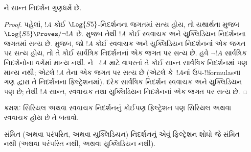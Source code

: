 \documentclass[../../../include/open-logic-section]{subfiles}
\begin{document}
\begin{cor}
  ને સાન્ત નિદર્શન ગુણધર્મ છે.
\end{cor}

\begin{proof}
  પહેલાં, $!A$ કોઈ $\Log{S5}$-નિદર્શનના જગતમાં સત્ય હોય,
  તો યથાર્થતા મુજબ $\Log{S5} \Proves/ \lnot !A$ છે.
   મુજબ તેથી $!A$ કોઈ
  સ્વવાચક અને યુક્લિડિયન નિદર્શનના જગતમાં સત્ય છે.
   મુજબ, જો $!A$ કોઈ સ્વવાચક
  અને યુક્લિડિયન નિદર્શનનાં એક જગત પર સત્ય હોય, તો તે કોઈ
  સાર્વત્રિક નિદર્શનનાં એક જગત પર સત્ય છે.
  હવે $\lnot !A$ સાર્વત્રિક નિદર્શનોના વર્ગમાં માન્ય નથી.
  ને $\lnot !A$ માટે વાપરતાં તે કોઈ
  સાન્ત સાર્વત્રિક નિદર્શનમાં પણ માન્ય નથી; એટલે $!A$ તેના એક
  જગત પર સત્ય છે (એટલે કે~$!A$નાં ઉપ-!!{formula}sના ગણ દ્વારા
  તે નિદર્શનના ફિલ્ટ્રેશનમાં). દરેક સાર્વત્રિક નિદર્શન
  સ્વવાચક અને યુક્લિડિયન પણ છે; તેથી $!A$ સાન્ત,
  સ્વવાચક તથા યુક્લિડિયન નિદર્શનનાં એક જગત પર સત્ય છે.
\end{proof}


\begin{prob}
  ક્રમશઃ સિરિયલ અથવા સ્વવાચક નિદર્શનનું કોઈપણ
  ફિલ્ટ્રેશન પણ સિરિયલ અથવા સ્વવાચક હોય છે તે બતાવો.
\end{prob}

\begin{prob}
  સંમિત (અથવા પરંપરિત, અથવા યુક્લિડિયન) નિદર્શનનું એવું
  ફિલ્ટ્રેશન શોધો જે સંમિત નથી (અથવા પરંપરિત નથી, અથવા
  યુક્લિડિયન નથી).
\end{prob}
\end{document}
